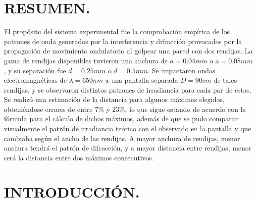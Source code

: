 \documentclass[12pt,a4paper]{article}
\begin{document}
\portada

\section{RESUMEN.} %
El propósito del sistema experimental fue la comprobación empírica de los patrones de onda generados por la interferencia y difracción provocados por la propagación de movimiento ondulatorio al golpear una pared con dos rendijas.
La gama de rendijas disponibles tuvieron una anchura de $a = 0.04mm$ o $a = 0.08mm$, y su separación fue $d = 0.25mm$ o $d=0.5mm$.
Se impactaron ondas electromagnéticas de $\lambda = 650nm$ a una pantalla separada $D=90cm$ de tales rendijas, y se observaron distintos patrones de irradiancia para cada par de estas.
Se realizó una estimación de la distancia para algunos máximos elegidos, obteniéndose errores de entre $7$\textsc{\%} y $23$\textsc{\%}, lo que sigue estando de acuerdo con la fórmula para el cálculo de dichos máximos, además de que se pudo comparar visualmente el patrón de irradiancia teórico con el observado en la pantalla y que cambiaba según el ancho de las rendijas.
A mayor anchura de rendijas, menor anchura tendrá el patrón de difracción, y a mayor distancia entre rendijas, menor será la distancia entre dos máximos consecutivos.

\section{INTRODUCCIÓN.} %
\end{document}

